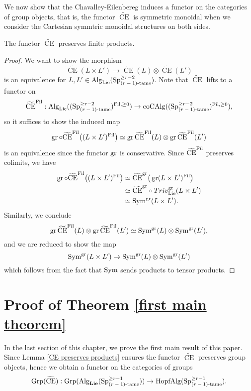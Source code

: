 We now show that the Chavalley-Eilenbereg induces a functor on the categories of group objects, that is, the functor $\widetilde{\operatorname{CE}}$ is symmetric monoidal when we consider the Cartesian symmtric monoidal structures on both sides.
\begin{lemma}
\label{CE preserves products}
	The functor 
	$\widetilde{\operatorname{CE}}$
	preserves finite products.
\end{lemma}
\begin{proof}
	We want to show the morphism 
	\[
	\widetilde{\operatorname{CE}}(L \times L') 
	\to 
	\widetilde{\operatorname{CE}}(L)\otimes \widetilde{\operatorname{CE}}(L') 
	\]
	is an equivalence for $L,L' \in \operatorname{Alg}_{\operatorname{Lie}}(\operatorname{Sp}^{\geq r-2}_{\text{($r-1$)-tame}})$. 
	Note that $\widetilde{\operatorname{CE}}$ lifts to a functor on 
	$$
	\widetilde{\operatorname{CE}}^{\operatorname{Fil}}: \operatorname{Alg}_{\operatorname{Lie}}((\operatorname{Sp}^{\geq r-2}_{\text{($r-1$)-tame}})^{\operatorname{Fil}, \geq 0})
	\to 
	\operatorname{coCAlg}((\operatorname{Sp}^{\geq r-2}_{\text{($r-1$)-tame}})^{\operatorname{Fil}, \geq 0}),
	$$
	so it suffices to show the induced map
	$$
	\operatorname{gr}\circ \widetilde{\operatorname{CE}}^{\operatorname{Fil}}\big( (L \times L')^{\operatorname{Fil}} \big) 
	\simeq 
	\operatorname{gr} \widetilde{\operatorname{CE}}^{\operatorname{Fil}}(L) \otimes \operatorname{gr}\widetilde{\operatorname{CE}}^{\operatorname{Fil}}(L')
	$$
	is an equivalence since the functor $\operatorname{gr}$ is conservative. 
	Since $\widetilde{\operatorname{CE}}^{\operatorname{Fil}}$ preserves colimits, we have 
	\begin{align*}
		\operatorname{gr}\circ \widetilde{\operatorname{CE}}^{\operatorname{Fil}}\big( (L \times L')^{\operatorname{Fil}} \big) 
	& \simeq 
	\widetilde{\operatorname{CE}}^{\operatorname{gr}} \big( \operatorname{gr} (L \times L')^{\operatorname{Fil}} \big) \\
	& \simeq 
	\widetilde{\operatorname{CE}}^{\operatorname{gr}} \circ Triv_{\operatorname{Lie}}^{\operatorname{gr}} (L\times L')\\
	& \simeq \operatorname{Sym}^{\operatorname{gr}} (L\times L').
	\end{align*}
	Similarly, we conclude 
	$$
	\operatorname{gr} \widetilde{\operatorname{CE}}^{\operatorname{Fil}}(L) \otimes \operatorname{gr}\widetilde{\operatorname{CE}}^{\operatorname{Fil}}(L') \simeq
	\operatorname{Sym}^{\operatorname{gr}} (L) \otimes  \operatorname{Sym}^{\operatorname{gr}} (L'), 
	$$
	and we are reduced to show the map 
	$$
	\operatorname{Sym}^{\operatorname{gr}} (L\times L') \to \operatorname{Sym}^{\operatorname{gr}} (L) \otimes  \operatorname{Sym}^{\operatorname{gr}} (L')
	$$
	which follows from the fact that $\operatorname{Sym}$ sends products to tensor products.
\end{proof}



\section{Proof of Theorem \ref{first main theorem}}
In the last section of this chapter, we prove the first main result of this paper. Since Lemma \ref{CE preserves products} ensures the functor $\widetilde{\operatorname{CE}}$ preserves group objects, hence we obtain a functor on the categories of groups
\[
	\operatorname{Grp}(\widetilde{\operatorname{CE}}):
	\operatorname{Grp}(\operatorname{Alg}_{\mathbf{Lie}}(\operatorname{Sp}^{\geq r-1}_{\text{($r-1$)-tame}}))
	\to 
	\operatorname{HopfAlg}(\operatorname{Sp}^{\geq r-1}_{\text{($r-1$)-tame}}).
\]
	
